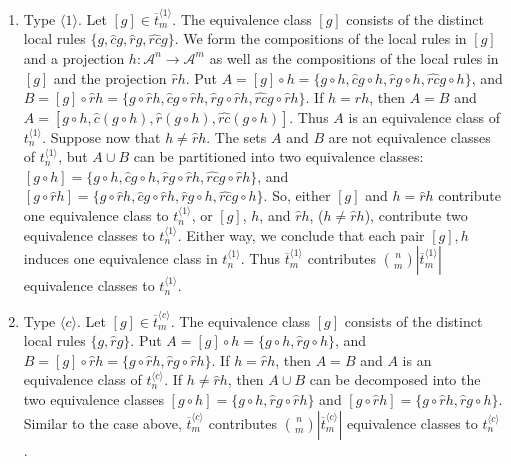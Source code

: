 \documentclass[a4paper]{article}
\begin{document}
\begin{enumerate}

\item Type $\langle 1 \rangle$.
Let $[g] \in \overline{t}^{\langle 1 \rangle}_m$.
The equivalence class $[g]$ consists of the distinct local rules
$ \{ g, \hat{c}g, \hat{r}g, \widehat{rc}g \}$.
We form the compositions
of the local rules in $[g]$ and a projection $h: \mathcal{A}^n \to \mathcal{A}^m$
as well as the compositions of the local rules in $[g]$ and the projection $\hat{r}h$.
Put $A = [g] \circ h = \{g \circ h, \hat{c}g \circ h, \hat{r}g \circ h, \widehat{rc}g \circ h \}$,
and $B = [g] \circ \hat{r}h = \{g \circ \hat{r}h, \hat{c}g \circ \hat{r}h,
\hat{r}g \circ \hat{r}h, \widehat{rc}g \circ \hat{r}h \}$.
If $h = \hat{r}h$, then $A = B$ and
$A = [g \circ h, \hat{c}(g \circ h), \hat{r}(g \circ h), \widehat{rc}(g \circ h)]$.
Thus $A$ is an equivalence class of $t^{\langle 1 \rangle}_n$.
Suppose now that $h \ne \hat{r}h$.
The sets $A$ and $B$ are not equivalence classes of $t^{\langle 1 \rangle}_n$, but
$A \cup B$ can be partitioned into two equivalence classes:
$[g \circ h] = \{g \circ h, \hat{c}g \circ h,
\hat{r} g \circ \hat{r} h, \widehat{rc} g \circ \hat{r} h \}$,
and
$[g \circ \hat{r}h] = \{g \circ \hat{r}h, \hat{c}g \circ \hat{r}h,
\hat{r} g \circ h, \widehat{rc} g \circ h \}$.
So, either $[g]$ and $h = \hat{r}h$ contribute one equivalence class to $t^{\langle 1 \rangle}_n$,
or $[g]$, $h$, and $\hat{r}h$, ($h \ne \hat{r}h$), contribute two
equivalence classes to $t^{\langle 1 \rangle}_n$.
Either way, we conclude that each pair $[g], h$ induces one equivalence class in $t^{\langle 1 \rangle}_n$.
Thus $\overline{t}^{\langle 1 \rangle}_m$
contributes  $\binom{n}{m} |\overline{t}^{\langle 1 \rangle}_m|$ equivalence classes to $t^{\langle 1 \rangle}_n$.

\item Type $\langle c \rangle$.
Let $[g] \in \overline{t}^{\langle c \rangle}_m$.
The equivalence class $[g]$ consists of the distinct local rules
$ \{ g, \hat{r}g \}$.
Put $A = [g] \circ h = \{g \circ h, \hat{r}g \circ h \}$, and
$B = [g] \circ \hat{r}h = \{g \circ \hat{r}h, \hat{r}g \circ \hat{r}h \}$.
If $h = \hat{r}h$, then $A = B$ and $A$ is an equivalence class of $t^{\langle c \rangle}_n$.
If $h \ne \hat{r}h$,
then $A \cup B$ can be decomposed into the two equivalence classes
$[g \circ h] = \{g \circ h, \hat{r}g \circ \hat{r}h\}$
and
$[g \circ \hat{r}h] = \{g \circ \hat{r}h, \hat{r}g \circ h\}$.
Similar to the case above, $\overline{t}^{\langle c \rangle}_m$
contributes  $\binom{n}{m} |\overline{t}^{\langle c \rangle}_m|$ equivalence classes to $t^{\langle c \rangle}_n$.


\end{enumerate}
\end{document}
